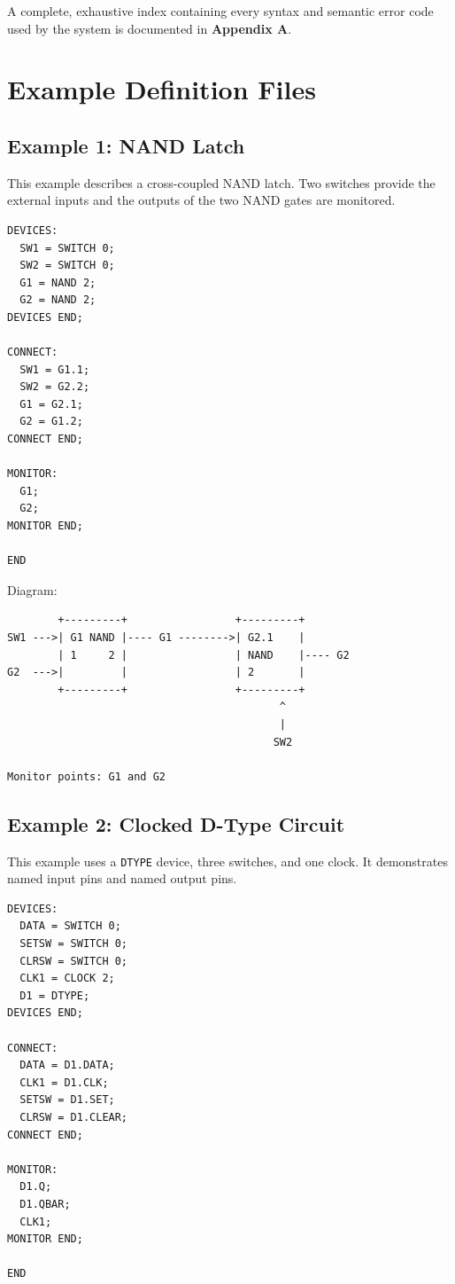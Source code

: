\documentclass[10pt,a4paper]{article}
\begin{document}
A complete, exhaustive index containing every syntax and semantic error code used by the system is documented in \textbf{Appendix A}.

\section{Example Definition Files}

\subsection{Example 1: NAND Latch}

This example describes a cross-coupled NAND latch. Two switches provide the
external inputs and the outputs of the two NAND gates are monitored.

\begin{verbatim}
DEVICES:
  SW1 = SWITCH 0;
  SW2 = SWITCH 0;
  G1 = NAND 2;
  G2 = NAND 2;
DEVICES END;

CONNECT:
  SW1 = G1.1;
  SW2 = G2.2;
  G1 = G2.1;
  G2 = G1.2;
CONNECT END;

MONITOR:
  G1;
  G2;
MONITOR END;

END
\end{verbatim}

Diagram:

\begin{verbatim}
        +---------+                 +---------+
SW1 --->| G1 NAND |---- G1 -------->| G2.1    |
        | 1     2 |                 | NAND    |---- G2
G2  --->|         |                 | 2       |
        +---------+                 +---------+
                                           ^
                                           |
                                          SW2

Monitor points: G1 and G2
\end{verbatim}

\subsection{Example 2: Clocked D-Type Circuit}

This example uses a \texttt{DTYPE} device, three switches, and one clock. It
demonstrates named input pins and named output pins.

\begin{verbatim}
DEVICES:
  DATA = SWITCH 0;
  SETSW = SWITCH 0;
  CLRSW = SWITCH 0;
  CLK1 = CLOCK 2;
  D1 = DTYPE;
DEVICES END;

CONNECT:
  DATA = D1.DATA;
  CLK1 = D1.CLK;
  SETSW = D1.SET;
  CLRSW = D1.CLEAR;
CONNECT END;

MONITOR:
  D1.Q;
  D1.QBAR;
  CLK1;
MONITOR END;

END
\end{verbatim}
\end{document}
